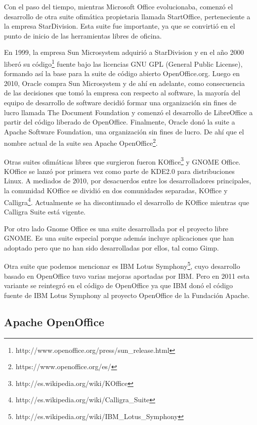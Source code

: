 \documentclass[12pt]{article}
\begin{document}
Con el paso del tiempo, mientras Microsoft Office evolucionaba, comenzó el desarrollo de otra suite ofimática propietaria llamada StartOffice, perteneciente a la empresa StarDivision. Esta suite fue importante, ya que se convirtió en el punto de inicio de las herramientas libres de oficina. 

En 1999, la empresa Sun Microsystem adquirió a StarDivision y en el año 2000 liberó su código\footnote{http://www.openoffice.org/press/sun\_release.html} fuente bajo las licencias GNU GPL (General Public License), formando así la base para la suite de código abierto OpenOffice.org. Luego en 2010, Oracle compra Sun Microsystem y de ahí en adelante, como consecuencia de las decisiones que tomó la empresa con respecto al software, la mayoría del equipo de desarrollo de software decidió formar una organización sin fines de lucro llamada The Document Foundation y comenzó el desarrollo de LibreOffice a partir del código liberado de OpenOffice. Finalmente, Oracle donó la suite a Apache Software Foundation, una organización sin fines de lucro. De ahí que el nombre actual de la suite sea Apache OpenOffice\footnote{https://www.openoffice.org/es/}. 

Otras suites ofimáticas libres que surgieron fueron KOffice\footnote{http://es.wikipedia.org/wiki/KOffice} y GNOME Office. KOffice se lanzó por primera vez como parte de KDE2.0 para distribuciones Linux. A mediados de 2010, por desacuerdos entre los desarrolladores principales, la comunidad KOffice se dividió en dos comunidades separadas, KOffice y Calligra\footnote{http://es.wikipedia.org/wiki/Calligra\_Suite}. Actualmente se ha discontinuado el desarrollo de KOffice mientras que Calligra Suite está vigente.

Por otro lado Gnome Office es una suite desarrollada por el proyecto libre GNOME. Es una suite especial porque además incluye aplicaciones que han adoptado pero que no han sido desarrolladas por ellos, tal como Gimp.  

Otra suite que podemos mencionar es IBM Lotus Symphony\footnote{http://es.wikipedia.org/wiki/IBM\_Lotus\_Symphony}, cuyo desarrollo basado en OpenOffice tuvo varias mejoras aportadas por IBM. Pero en 2011 esta variante se reintegró en el código de OpenOffice ya que IBM donó el código fuente de IBM Lotus Symphony al proyecto OpenOffice de la Fundación Apache. 

\subsection*{Apache OpenOffice}
\end{document}
